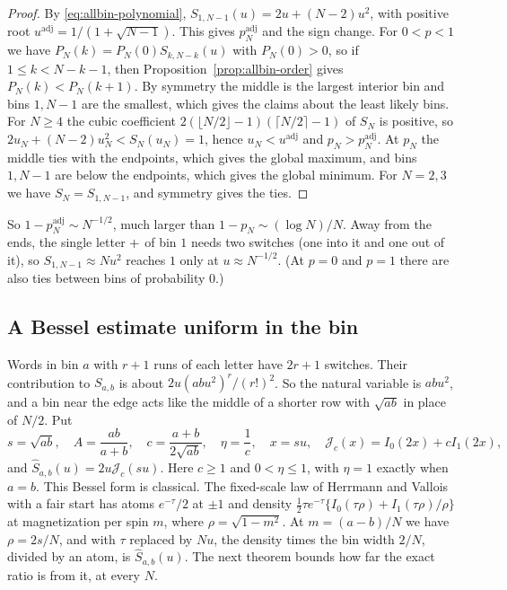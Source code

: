 \begin{proof}
By \eqref{eq:allbin-polynomial}, $S_{1,N-1}(u)=2u+(N-2)u^2$, with positive
root $u^{\mathrm{adj}}=1/(1+\sqrt{N-1})$. This gives $p_N^{\mathrm{adj}}$ and
the sign change. For $0<p<1$ we have $P_N(k)=P_N(0)S_{k,N-k}(u)$ with
$P_N(0)>0$, so if $1\le k<N-k-1$, then Proposition~\ref{prop:allbin-order} gives
$P_N(k)<P_N(k+1)$. By symmetry the middle is the largest interior bin and bins
$1,N-1$ are the smallest, which gives the claims about the least likely bins.
For $N\ge4$ the cubic coefficient $2(\lfloor N/2\rfloor-1)(\lceil N/2\rceil-1)$
of $S_N$ is positive, so $2u_N+(N-2)u_N^2<S_N(u_N)=1$, hence
$u_N<u^{\mathrm{adj}}$ and $p_N>p_N^{\mathrm{adj}}$. At $p_N$ the middle ties
with the endpoints, which gives the global maximum, and bins $1,N-1$ are below
the endpoints, which gives the global minimum. For $N=2,3$ we have
$S_N=S_{1,N-1}$, and symmetry gives the ties.
\end{proof}

So $1-p_N^{\mathrm{adj}}\sim N^{-1/2}$, much larger than
$1-p_N\sim(\log N)/N$. Away from the ends, the single letter $\mathord{+}$ of bin $1$
needs two switches (one into it and one out of it), so $S_{1,N-1}\approx Nu^2$ reaches $1$ only
at $u\approx N^{-1/2}$. (At $p=0$ and $p=1$ there are also ties between bins of
probability $0$.)

\subsection{A Bessel estimate uniform in the bin}\label{sec:allbin-bessel}

Words in bin $a$ with $r+1$ runs of each letter have $2r+1$ switches.
Their contribution to $S_{a,b}$ is about $2u(abu^2)^r/(r!)^2$.
So the natural variable is $abu^2$, and a bin near the
edge acts like the middle of a shorter row with $\sqrt{ab}$ in place of $N/2$.
Put
\[
 s=\sqrt{ab},\quad A=\frac{ab}{a+b},\quad
 c=\frac{a+b}{2\sqrt{ab}},\quad
 \eta=\frac1c,\quad x=su,\quad \mathcal J_c(x)=I_0(2x)+cI_1(2x),
\]
and $\widehat S_{a,b}(u)=2u\mathcal J_c(su)$. Here $c\ge1$ and $0<\eta\le1$, with
$\eta=1$ exactly when $a=b$. This Bessel form is classical. The fixed-scale
law of Herrmann and Vallois~\cite[Remark~3.4]{herrmann2010} with a fair start
has atoms $e^{-\tau}/2$ at $\pm1$ and density
$\frac12\tau e^{-\tau}\{I_0(\tau\rho)+I_1(\tau\rho)/\rho\}$ at magnetization
per spin $m$, where $\rho=\sqrt{1-m^2}$. At $m=(a-b)/N$ we have
$\rho=2s/N$, and with $\tau$ replaced by $Nu$, the density times the bin
width $2/N$, divided by an atom, is $\widehat S_{a,b}(u)$. The next theorem
bounds how far the exact ratio is from it, at every $N$.

